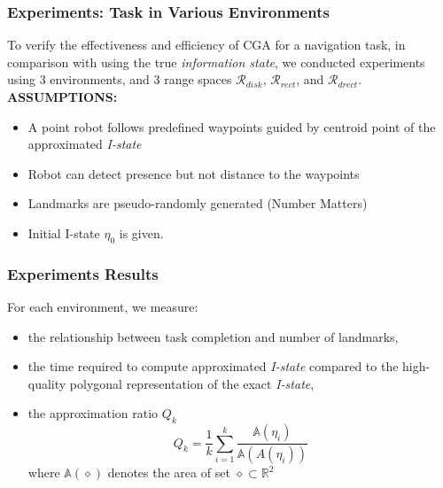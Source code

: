 \documentclass[compress]{beamer}
\begin{document}
\begin{frame}\frametitle{Experiments: Task in Various Environments}
To verify the effectiveness and efficiency of CGA for a navigation task,
in comparison with using the true \emph{information state},
we conducted experiments using 3 environments, and 3 range spaces $\mathcal{R}_{disk}$, $\mathcal{R}_{rect}$, and
$\mathcal{R}_{drect}$. \\

\textbf{ASSUMPTIONS:}\\
\begin{itemize}
\item A point robot follows predefined waypoints guided by centroid point of the approximated \emph{I-state}
\item Robot can detect presence but not distance to the waypoints
\item Landmarks are pseudo-randomly generated (Number Matters)
\item Initial I-state $\eta_0$ is given.
\end{itemize}

\end{frame}


\begin{frame}\frametitle{Experiments Results}
For each environment, we measure:\\
\begin{itemize}
	\item the relationship between task completion and number of landmarks,
	\item the time required to compute approximated \emph{I-state} compared to the
	       high-quality polygonal representation of the exact \emph{I-state},
	\item the approximation ratio $Q_k$\\
        \begin{equation}
	       Q_k = \frac{1}{k} \sum_{i=1}^k \frac{\mathbb{A}(\eta_i)}{\mathbb{A}(A(\eta_i))}
        \end{equation}
        where $\mathbb{A}(\diamond)$ denotes the area of set $\diamond \subset \mathbb{R}^2$
\end{itemize}
\transboxout
\end{frame}
\end{document}
